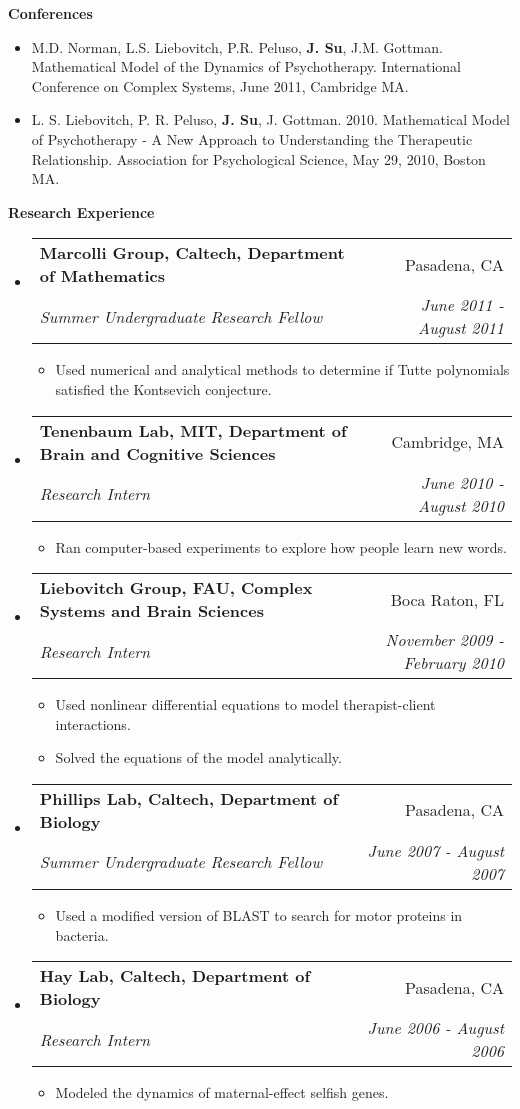 \documentclass[letterpaper,11pt]{article}
\makeatletter
\newcommand{\resitem}[1]{\item #1 \vspace{-2pt}}
\newcommand{\resheading}[1]{{\large \colorbox{mygrey}{\begin{minipage}{\textwidth}{\textbf{#1 \vphantom{p\^{E}}}}\end{minipage}}}}
\newcommand{\ressubheading}[4]{
\begin{tabular*}{7.0in}{l@{\extracolsep{\fill}}r}
		\textbf{#1} & #2 \\
		\textit{#3} & \textit{#4} \\
\end{tabular*}\vspace{-6pt}}
\makeatother
\begin{document}
\resheading{Conferences}
\begin{itemize}
	\item M.D. Norman, L.S. Liebovitch, P.R. Peluso, \textbf{J. Su}, J.M. Gottman.  Mathematical Model of the Dynamics of Psychotherapy.  International Conference on Complex Systems, June 2011, Cambridge MA.
	\item L. S. Liebovitch, P. R. Peluso, \textbf{J. Su}, J. Gottman. 2010. Mathematical Model of Psychotherapy - A New Approach to Understanding the Therapeutic Relationship. Association for Psychological Science, May 29, 2010, Boston MA.
\end{itemize}

\resheading{Research Experience}
\begin{itemize}
\item
	\ressubheading{Marcolli Group, Caltech, Department of Mathematics}{Pasadena, CA}{Summer Undergraduate Research Fellow}{June 2011 - August 2011}
	\begin{itemize}
		\resitem{Used numerical and analytical methods to determine if Tutte polynomials satisfied the Kontsevich conjecture.}
	\end{itemize}
	
\item
	\ressubheading{Tenenbaum Lab, MIT, Department of Brain and Cognitive Sciences}{Cambridge, MA}{Research Intern}{June 2010 - August 2010}
	\begin{itemize}
		\resitem{Ran computer-based experiments to explore how people learn new words.}
	\end{itemize}
	

\item
	\ressubheading{Liebovitch Group, FAU, Complex Systems and Brain Sciences}{Boca Raton, FL}{Research Intern}{November 2009 - February 2010}
	\begin{itemize}
		\resitem{Used nonlinear differential equations to model therapist-client interactions.}
		\resitem{Solved the equations of the model analytically.}
	\end{itemize}


\item
	\ressubheading{Phillips Lab, Caltech, Department of Biology}{Pasadena, CA}{Summer Undergraduate Research Fellow}{June 2007 - August 2007}
	\begin{itemize}
		\resitem{Used a modified version of BLAST to search for motor proteins in bacteria.}
	\end{itemize}

\item
	\ressubheading{Hay Lab, Caltech, Department of Biology}{Pasadena, CA}{Research Intern}{June 2006 - August 2006}
	\begin{itemize}
		\resitem{Modeled the dynamics of maternal-effect selfish genes.}
	\end{itemize}

\end{itemize}
\end{document}
